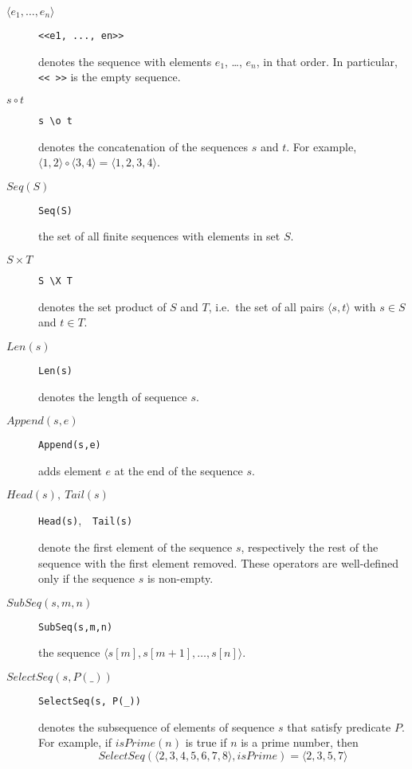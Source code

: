 \documentclass[11pt,fleqn]{article}
\newcommand{\seq}[1]{\ensuremath{\langle #1 \rangle}}
\begin{document}
\begin{description}
\item[$\seq{e_1,\dots,e_n}$]\qquad \verb|<<e1, ..., en>>|

  denotes the sequence with elements $e_1$, \dots, $e_n$, in that order. In
  particular, \verb|<< >>| is the empty sequence.
  
\item[$s \circ t$]\qquad \verb|s \o t|

  denotes the concatenation of the sequences $s$ and $t$. For example,
  $\seq{1,2} \circ \seq{3,4} = \seq{1,2,3,4}$.
  
\item[$\mathit{Seq}(S)$]\qquad \verb|Seq(S)|

  the set of all finite sequences with elements in set $S$.
  
\item[$S \times T$]\qquad \verb|S \X T|

  denotes the set product of $S$ and $T$, i.e.\ the set of all pairs $\seq{s,t}$
  with $s \in S$ and $t \in T$.
  
\item[$\mathit{Len}(s)$]\qquad \verb|Len(s)|

  denotes the length of sequence $s$.
  
\item[$\mathit{Append}(s,e)$]\qquad \verb|Append(s,e)|

  adds element $e$ at the end of the sequence $s$.

\item[$\mathit{Head}(s),\ \mathit{Tail}(s)$]\qquad
  \verb|Head(s)|,\ \ \verb|Tail(s)|

  denote the first element of the sequence $s$, respectively the rest of the
  sequence with the first element removed. These operators are well-defined only
  if the sequence $s$ is non-empty.
  
\item[$\mathit{SubSeq}(s,m,n)$]\qquad \verb|SubSeq(s,m,n)|

  the sequence $\seq{s[m], s[m+1], \dots, s[n]}$.

\item[$\mathit{SelectSeq(s, P(\_))}$]\qquad \verb|SelectSeq(s, P(_))|

  denotes the subsequence of elements of sequence $s$ that satisfy predicate
  $P$. For example, if $\mathit{isPrime}(n)$ is true if $n$ is a prime number,
  then
  \[ \mathit{SelectSeq}(\seq{2,3,4,5,6,7,8}, \mathit{isPrime}) =
     \seq{2,3,5,7} \]
\end{description}
\end{document}
